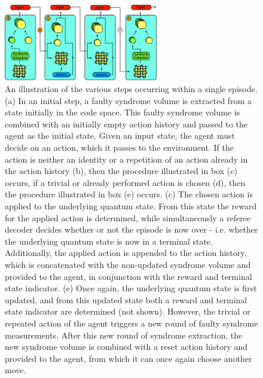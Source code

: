 \documentclass[twocolumn,preprintnumbers,amsmath,amssymb,notitlepage,nofootinbib,longbibliography,superscriptaddress,aps,pra,10pt]{revtex4-1}
\begin{document}
	\begin{figure}
		\centering
		\includegraphics[width=0.6\textwidth]{figures/decoding_as_rl.pdf}
		\caption{
			An illustration of the various steps occurring within a single episode.
			(a) In an initial step, a faulty syndrome volume is extracted from a state initially in the code space.
			This faulty syndrome volume is combined with an initially empty action history and passed to the agent as the initial state.
			Given an input state, the agent must decide on an action, which it passes to the environment.
			If the action is neither an identity or a repetition of an action already in the action history (b), then the procedure illustrated in box (c) occurs, if a trivial or already performed action is chosen (d), then the procedure illustrated in box (e) occurs.
			(c) The chosen action is applied to the underlying quantum state.
			From this state the reward for the applied action is determined, while simultaneously a referee decoder decides whether or not the episode is now over - i.e.
			whether the underlying quantum state is now in a terminal state.
			Additionally, the applied action is appended to the action history, which is concatenated with the non-updated syndrome volume and provided to the agent, in conjunction with the reward and terminal state indicator.
			(e) Once again, the underlying quantum state is first updated, and from this updated state both a reward and terminal state indicator are determined (not shown).
			However, the trivial or repeated action of the agent triggers a new round of faulty syndrome measurements.
			After this new round of syndrome extraction, the new syndrome volume is combined with a reset action history and provided to the agent, from which it can once again choose another move.
		}
		\label{f:single_episode}
	\end{figure}
\end{document}
